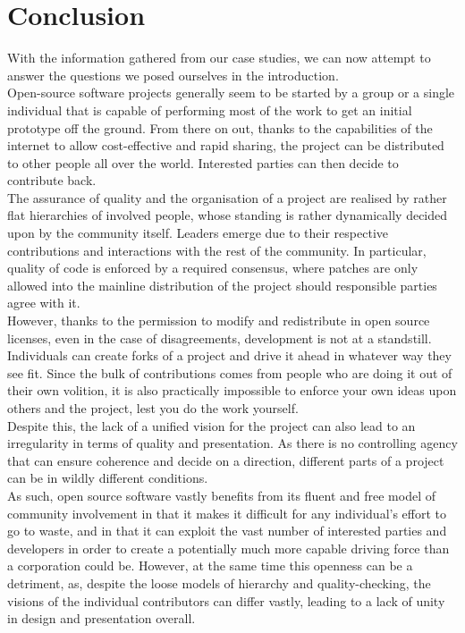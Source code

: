 \section{Conclusion}
With the information gathered from our case studies, we can now attempt to answer the questions we posed ourselves in the introduction. \\

Open-source software projects generally seem to be started by a group or a single individual that is capable of performing most of the work to get an initial prototype off the ground. From there on out, thanks to the capabilities of the internet to allow cost-effective and rapid sharing, the project can be distributed to other people all over the world. Interested parties can then decide to contribute back. \\

The assurance of quality and the organisation of a project are realised by rather flat hierarchies of involved people, whose standing is rather dynamically decided upon by the community itself. Leaders emerge due to their respective contributions and interactions with the rest of the community. In particular, quality of code is enforced by a required consensus, where patches are only allowed into the mainline distribution of the project should responsible parties agree with it. \\

However, thanks to the permission to modify and redistribute in open source licenses, even in the case of disagreements, development is not at a standstill. Individuals can create forks of a project and drive it ahead in whatever way they see fit. Since the bulk of contributions comes from people who are doing it out of their own volition, it is also practically impossible to enforce your own ideas upon others and the project, lest you do the work yourself. \\

Despite this, the lack of a unified vision for the project can also lead to an irregularity in terms of quality and presentation. As there is no controlling agency that can ensure coherence and decide on a direction, different parts of a project can be in wildly different conditions. \\

As such, open source software vastly benefits from its fluent and free model of community involvement in that it makes it difficult for any individual's effort to go to waste, and in that it can exploit the vast number of interested parties and developers in order to create a potentially much more capable driving force than a corporation could be. However, at the same time this openness can be a detriment, as, despite the loose models of hierarchy and quality-checking, the visions of the individual contributors can differ vastly, leading to a lack of unity in design and presentation overall.

